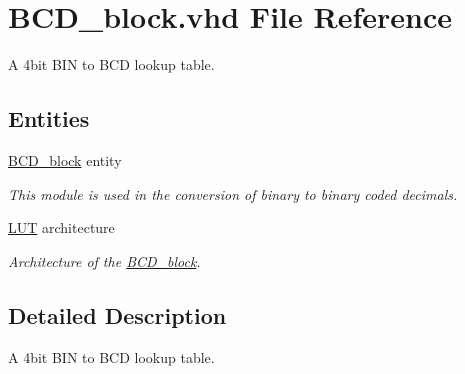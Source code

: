 \hypertarget{BCD__block_8vhd}{\section{B\-C\-D\-\_\-block.\-vhd File Reference}
\label{BCD__block_8vhd}
}


A 4bit B\-I\-N to B\-C\-D lookup table.  


\subsection*{Entities}
\begin{DoxyCompactItemize}
\item 
\hyperlink{classBCD__block}{B\-C\-D\-\_\-block} entity
\begin{DoxyCompactList}\small\item\em This module is used in the conversion of binary to binary coded decimals. \end{DoxyCompactList}\item 
\hyperlink{classBCD__block_1_1LUT}{L\-U\-T} architecture
\begin{DoxyCompactList}\small\item\em Architecture of the \hyperlink{classBCD__block}{B\-C\-D\-\_\-block}. \end{DoxyCompactList}\end{DoxyCompactItemize}


\subsection{Detailed Description}
A 4bit B\-I\-N to B\-C\-D lookup table. 